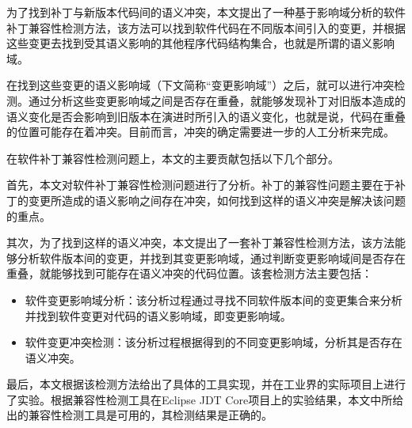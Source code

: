 为了找到补丁与新版本代码间的语义冲突，本文提出了一种基于影响域分析的软件补丁兼容性检测方法，该方法可以找到软件代码在不同版本间引入的变更，并根据这些变更去找到受其语义影响的其他程序代码结构集合，也就是所谓的语义影响域。

在找到这些变更的语义影响域（下文简称“变更影响域”）之后，就可以进行冲突检测。通过分析这些变更影响域之间是否存在重叠，就能够发现补丁对旧版本造成的语义变化是否会影响到旧版本在演进时所引入的语义变化，也就是说，代码在重叠的位置可能存在着冲突。目前而言，冲突的确定需要进一步的人工分析来完成。

在软件补丁兼容性检测问题上，本文的主要贡献包括以下几个部分。

首先，本文对软件补丁兼容性检测问题进行了分析。补丁的兼容性问题主要在于补丁的变更所造成的语义影响之间存在冲突，如何找到这样的语义冲突是解决该问题的重点。

其次，为了找到这样的语义冲突，本文提出了一套补丁兼容性检测方法，该方法能够分析软件版本间的变更，并找到其变更影响域，通过判断变更影响域间是否存在重叠，就能够找到可能存在语义冲突的代码位置。该套检测方法主要包括：
	\begin{itemize}
		\item 软件变更影响域分析：该分析过程通过寻找不同软件版本间的变更集合来分析并找到软件变更对代码的语义影响域，即变更影响域。
		\item 软件变更冲突检测：该分析过程根据得到的不同变更影响域，分析其是否存在语义冲突。
	\end{itemize}
	
最后，本文根据该检测方法给出了具体的工具实现，并在工业界的实际项目上进行了实验。根据兼容性检测工具在Eclipse JDT Core项目上的实验结果，本文中所给出的兼容性检测工具是可用的，其检测结果是正确的。



